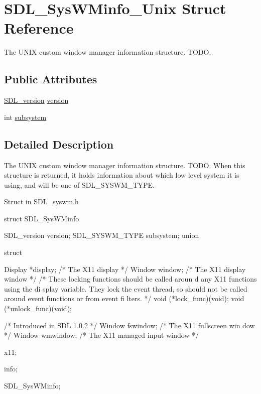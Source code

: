 \hypertarget{struct_s_d_l___sys_w_minfo___unix}{
\section{SDL\_\-SysWMinfo\_\-Unix Struct Reference}
\label{struct_s_d_l___sys_w_minfo___unix}
}


The UNIX custom window manager information structure. TODO.  


\subsection*{Public Attributes}
\begin{DoxyCompactItemize}
\item 
\hyperlink{struct_s_d_l__version}{SDL\_\-version} \hyperlink{struct_s_d_l___sys_w_minfo___unix_a916172fa6da739f2732e9d7b96448492}{version}
\item 
int \hyperlink{struct_s_d_l___sys_w_minfo___unix_a71a729f014bd9247f4a8bc2f429745f3}{subsystem}
\end{DoxyCompactItemize}


\subsection{Detailed Description}
The UNIX custom window manager information structure. TODO. When this structure is returned, it holds information about which low level system it is using, and will be one of SDL\_\-SYSWM\_\-TYPE. 

Struct in SDL\_\-syswm.h 
\begin{DoxyCode}
            struct SDL_SysWMinfo {
                        SDL_version version;
                        SDL_SYSWM_TYPE subsystem;
                        union 
                        {
                        struct 
                        {
                                Display *display;       /* The X11 display */
                                Window window;          /* The X11 display window
       */
                                /* These locking functions should be called aroun
      d
                                                   any X11 functions using the di
      splay variable.
                                                   They lock the event thread, so
       should not be
                                   called around event functions or from event fi
      lters.
                                 */
                                void (*lock_func)(void);
                                void (*unlock_func)(void);

                                /* Introduced in SDL 1.0.2 */
                                Window fswindow;        /* The X11 fullscreen win
      dow */
                                Window wmwindow;        /* The X11 managed input 
      window */
                        } x11;
                 } info;
            } SDL_SysWMinfo;            
\end{DoxyCode}
  

